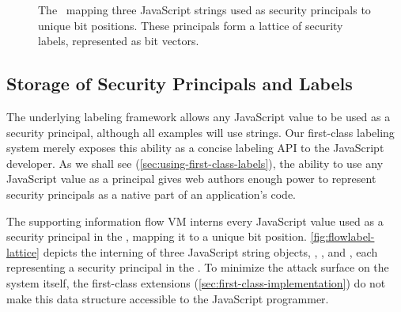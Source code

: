 \begin{figure}[t]
{
}
 \caption{The \FlowLabelRegistry\ mapping three JavaScript strings used as security principals to unique bit positions.
   These principals form a lattice of security labels, represented as bit vectors.}
 \label{fig:flowlabel-lattice}
\end{figure}

\subsection{Storage of Security Principals and Labels}
\label{sec:label-storage}

The underlying labeling framework allows any JavaScript value to be used as a security principal, although all examples will use strings.
Our first-class labeling system merely exposes this ability as a concise labeling API to the JavaScript developer.
As we shall see (\autoref{sec:using-first-class-labels}), the ability to use any JavaScript value as a principal gives web authors enough power to represent security principals as a native part of an application's code.

The supporting information flow VM interns every JavaScript value used as a security principal in the \FlowLabelRegistry, mapping it to a unique bit position.
\autoref{fig:flowlabel-lattice} depicts the interning of three JavaScript string objects, , , and , each representing a security principal in the \FlowLabelRegistry.
To minimize the attack surface on the system itself, the first-class extensions (\autoref{sec:first-class-implementation}) do not make this data structure accessible to the JavaScript programmer.


